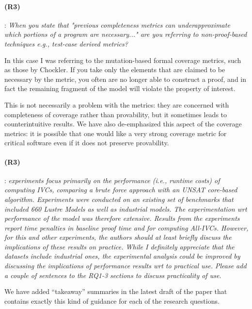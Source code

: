\documentclass{article}
\begin{document}
\paragraph{(R3)}: \textit{When you state that "previous completeness metrics can underapproximate which portions of a program are necessary..." are you referring to non-proof-based techniques e.g., test-case derived metrics?}
\vspace{0.05in}

In this case I was referring to the mutation-based formal coverage metrics, such as those by Chockler.  If you take only the elements that are claimed to be necessary by the metric, you often are no longer able to construct a proof, and in fact the remaining fragment of the model will violate the property of interest.

This is not necessarily a problem with the metrics: they are concerned with completeness of coverage rather than provability, but it sometimes leads to counterintuitive results.  We have also de-emphasized this aspect of the coverage metrics: it is possible that one would like a very strong coverage metric for critical software even if it does not preserve provability.  

\paragraph{(R3)}: \textit{experiments focus primarily on the performance (i.e., runtime costs) of computing IVCs, comparing a brute force approach with an UNSAT core-based algorithm. Experiments were conducted on an existing set of benchmarks that included 660 Lustre Models as well as industrial models. The experimentation wrt performance of the model was therefore extensive. Results from the experiments report time penalties in baseline proof time and for computing All-IVCs. However, for this and other experiments, the authors should at least briefly discuss the implications of these results on practice. While I definitely appreciate that the datasets include industrial ones, the experimental analysis could be improved by discussing the implications of performance results wrt to practical use. Please add a couple of sentences to the RQ1-3 sections to discuss practicality of use.}
\vspace{0.05in}

We have added ``takeaway'' summaries in the latest draft of the paper that contains exactly this kind of guidance for each of the research questions.
\end{document}
